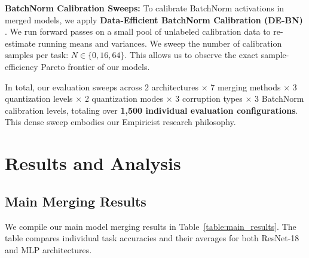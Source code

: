 \documentclass{article}
\theoremstyle{plain}
\theoremstyle{definition}
\theoremstyle{remark}
\begin{document}
\textbf{BatchNorm Calibration Sweeps:} To calibrate BatchNorm activations in merged models, we apply \textbf{Data-Efficient BatchNorm Calibration (DE-BN)} \cite{submission10}. We run forward passes on a small pool of unlabeled calibration data to re-estimate running means and variances. We sweep the number of calibration samples per task: $N \in \{0, 16, 64\}$. This allows us to observe the exact sample-efficiency Pareto frontier of our models.

In total, our evaluation sweeps across 2 architectures $\times$ 7 merging methods $\times$ 3 quantization levels $\times$ 2 quantization modes $\times$ 3 corruption types $\times$ 3 BatchNorm calibration levels, totaling over \textbf{1,500 individual evaluation configurations}. This dense sweep embodies our Empiricist research philosophy.

\section{Results and Analysis}
\label{sec:results}

\subsection{Main Merging Results}

We compile our main model merging results in Table~\ref{table:main_results}. The table compares individual task accuracies and their averages for both ResNet-18 and MLP architectures.


\end{document}
